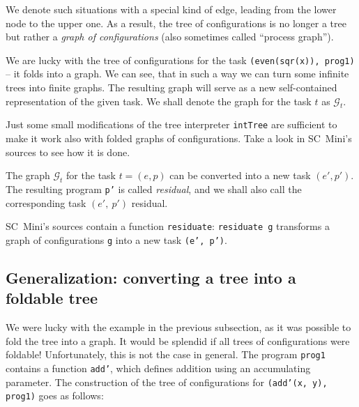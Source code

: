 We denote such situations with a special kind of edge, leading from the lower node to the upper one.
As a result, the tree of configurations is no longer a tree but rather a \emph{graph of configurations}
(also sometimes called ``process graph'').

We are lucky with the tree of configurations for the task \texttt{(even(sqr(x)), prog1)} -- it folds into a 
graph.
We can see, that in such a way we can turn some infinite trees into finite graphs. 
The resulting graph will serve as a new self-contained representation of the given task.
We shall denote the graph for the task $t$ as $\mathcal{G}_t$.

\begin{exercise}
Just some small modifications of the tree interpreter \texttt{intTree} are sufficient to make
it work also with folded graphs of configurations. Take a look in SC~Mini's sources to see how it is done.
\end{exercise}

The graph $\mathcal{G}_t$ for the task $t = (e, p)$ can be converted into a new task $(e', p')$.
The resulting program \texttt{p'} is called \emph{residual}, and we shall also call
the corresponding task $(e',~p')$ residual.

\begin{exercise}
SC~Mini's sources contain a function \texttt{residuate}: \texttt{residuate g} transforms
a graph of configurations \texttt{g} into a new task \texttt{(e',~p')}.
\end{exercise}

\subsection{Generalization: converting a tree into a foldable tree}

We were lucky with the example in the previous subsection, as it was possible to fold the tree into a graph.
It would be splendid if all trees of configurations were foldable! 
Unfortunately, this is not the case in general.
The program \texttt{prog1} contains a function \texttt{add'}, which defines
addition using an accumulating parameter.
The construction of the tree of configurations for \texttt{(add'(x, y), prog1)} goes as follows:\\


